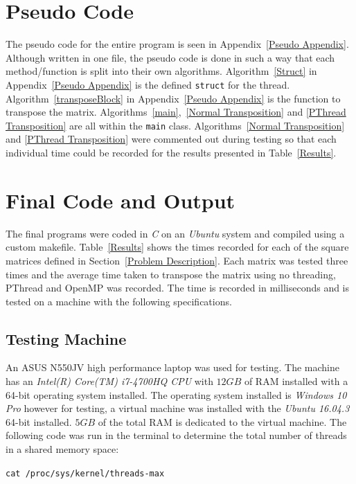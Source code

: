 \documentclass[10pt, conference]{IEEEtran}
\def\code#1{\texttt{#1}}
\begin{document}
\section{Pseudo Code}
\label{Pseudo Code}

The pseudo code for the entire program is seen in Appendix~\ref{Pseudo Appendix}. Although written in one file, the pseudo code is done in such a way that each method/function is split into their own algorithms. Algorithm~\ref{Struct} in Appendix~\ref{Pseudo Appendix} is the defined \code{struct} for the thread. Algorithm~\ref{transposeBlock} in Appendix~\ref{Pseudo Appendix} is the function to transpose the matrix. Algorithms~\ref{main},~\ref{Normal Transposition} and \ref{PThread Transposition} are all within the \code{main} class. Algorithms~\ref{Normal Transposition} and \ref{PThread Transposition} were commented out during testing so that each individual time could be recorded for the results presented in Table~\ref{Results}.

\section{Final Code and Output}
\label{Final Code and Output}

The final programs were coded in \emph{C} on an \emph{Ubuntu} system and compiled using a custom makefile. Table~\ref{Results} shows the times recorded for each of the square matrices defined in Section~\ref{Problem Description}. Each matrix was tested three times and the average time taken to transpose the matrix using no threading, PThread and OpenMP was recorded. The time is recorded in milliseconds and is tested on a machine with the following specifications.

\subsection{Testing Machine}
\label{Testing Machine}
An ASUS N550JV high performance laptop was used for testing. The machine has an \emph{Intel(R) Core(TM) i7-4700HQ CPU} with $12GB$ of RAM installed with a 64-bit operating system installed. The operating system installed is \emph{Windows 10 Pro} however for testing, a virtual machine was installed with the \emph{Ubuntu 16.04.3} 64-bit installed. $5GB$ of the total RAM is dedicated to the virtual machine. The following code was run in the terminal to determine the total number of threads in a shared memory space:

\code{cat /proc/sys/kernel/threads-max}
\end{document}
